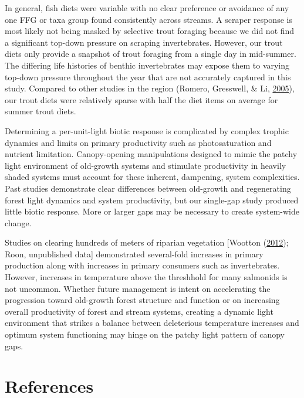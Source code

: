 \documentclass[double,12pt]{beavtex}
\begin{document}
  In general, fish diets were variable with no clear preference or
  avoidance of any one FFG or taxa group found consistently across
  streams. A scraper response is most likely not being masked by selective
  trout foraging because we did not find a significant top-down pressure
  on scraping invertebrates. However, our trout diets only provide a
  snapshot of trout foraging from a single day in mid-summer. The
  differing life histories of benthic invertebrates may expose them to
  varying top-down pressure throughout the year that are not accurately
  captured in this study. Compared to other studies in the region (Romero,
  Gresswell, \& Li, \protect\hyperlink{ref-Romero2005}{2005}), our trout
  diets were relatively sparse with half the diet items on average for
  summer trout diets.
  
  Determining a per-unit-light biotic response is complicated by complex
  trophic dynamics and limits on primary productivity such as
  photosaturation and nutrient limitation. Canopy-opening manipulations
  designed to mimic the patchy light environment of old-growth systems and
  stimulate productivity in heavily shaded systems must account for these
  inherent, dampening, system complexities. Past studies demonstrate clear
  differences between old-growth and regenerating forest light dynamics
  and system productivity, but our single-gap study produced little biotic
  response. More or larger gaps may be necessary to create system-wide
  change.
  
  Studies on clearing hundreds of meters of riparian vegetation {[}Wootton
  (\protect\hyperlink{ref-Wootton2012}{2012}); Roon, unpublished data{]}
  demonstrated several-fold increases in primary production along with
  increases in primary consumers such as invertebrates. However, increases
  in temperature above the threshhold for many salmonids is not uncommon.
  Whether future management is intent on accelerating the progression
  toward old-growth forest structure and function or on increasing overall
  productivity of forest and stream systems, creating a dynamic light
  environment that strikes a balance between deleterious temperature
  increases and optimum system functioning may hinge on the patchy light
  pattern of canopy gaps.
  
  \pagebreak
  
  \chapter*{References}\label{references}
  
\end{document}
